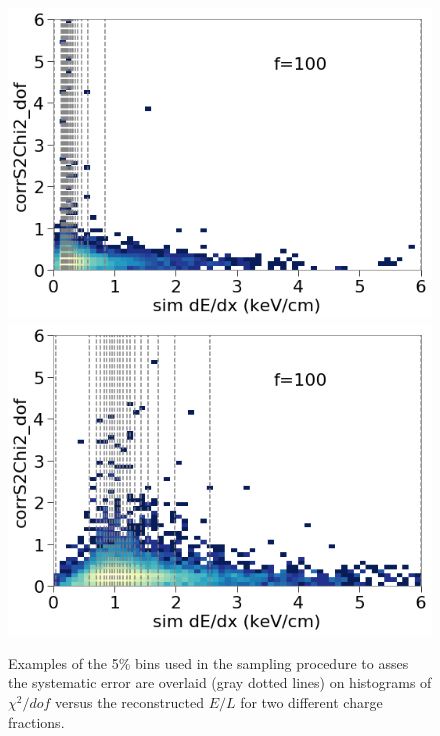 \begin{figure}[htbp]
\begin{center}
\includegraphics[width=\halffig]{figures/lips/chi2_dedx_f100_bins.png}
\includegraphics[width=\halffig]{figures/lips/chi2_dedx_f50_bins.png}
\caption{Examples of the 5\% bins used in the sampling procedure to asses the systematic error are overlaid (gray dotted lines) on histograms of $\chi^{2}/dof$ versus the reconstructed $E/L$ for two different charge fractions. }
\label{fig:chi2_dedx_bins}
\end{center}
\end{figure}

